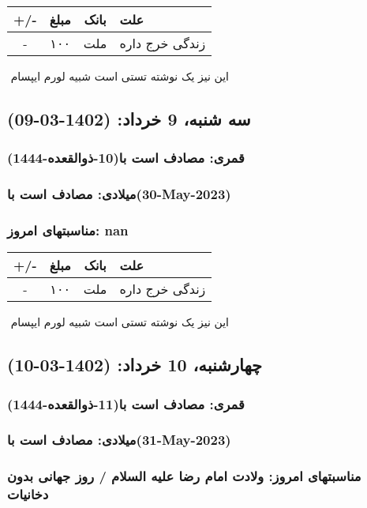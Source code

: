 \documentclass{article}
\newcommand{\rnote}[1]{\marginpar{\textcolor{color}{\StrSubstitute{\##1}{ }{\_}}}}
\newcommand{\myRow}[4]{
    #1 & #2 & #3 & #4 \\ \hline
}
\begin{document}
\begin{tabular}{ | c | c | c | p{5cm} |}
    \hline
    \myRow{ +/- }{مبلغ}{بانک}{علت}
    \myRow{-}{۱۰۰}{ملت}{زندگی خرج داره}
\end{tabular}
\newline
\newline

‌
\rnote{تست}
این نیز یک نوشته تستی است شبیه لورم ایپسام




\newpage
{}
\textcolor{color}{
\section{ سه شنبه، 9 خرداد: (1402-03-09) }
\subsubsection*{قمری: مصادف است با(10-ذوالقعده-1444)} 
\subsubsection*{میلادی: مصادف است با(30-May-2023)}
\subsubsection*{مناسبتهای امروز: nan}
}


\begin{tabular}{ | c | c | c | p{5cm} |}
    \hline
    \myRow{ +/- }{مبلغ}{بانک}{علت}
    \myRow{-}{۱۰۰}{ملت}{زندگی خرج داره}
\end{tabular}
\newline
\newline

‌
\rnote{تست}
این نیز یک نوشته تستی است شبیه لورم ایپسام




\newpage
{}
\textcolor{color}{
\section{ چهارشنبه، 10 خرداد: (1402-03-10) }
\subsubsection*{قمری: مصادف است با(11-ذوالقعده-1444)} 
\subsubsection*{میلادی: مصادف است با(31-May-2023)}
\subsubsection*{مناسبتهای امروز: ولادت امام رضا علیه السلام / روز جهانی بدون دخانیات}
}
\end{document}

